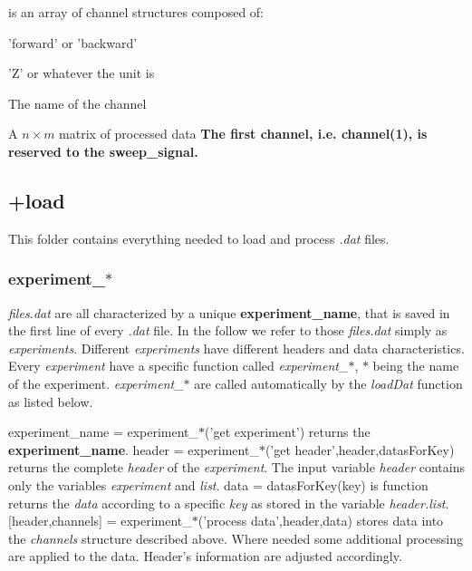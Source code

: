 \item[channels] is an array of channel structures composed of:
  \bdf
  \item[Direction] 'forward' or 'backward'
  \item[Unit] 'Z' or whatever the unit is
  \item[Name] The name of the channel
  \item[data] A $n\times m$ matrix of processed data
  \edf
\edf
\textbf{The first channel, i.e. channel(1), is reserved to the sweep\_signal.}

\subsection{+load}
This folder contains everything needed to load and process \emph{.dat} files.
\subsubsection{experiment\_$\ast$}
\emph{files.dat} are all characterized by a unique \textbf{experiment\_name}, that is saved in the first line of every \emph{.dat} file.
In the follow we refer to those \emph{files.dat} simply as \emph{experiments}.
Different \emph{experiments} have different headers and data characteristics.
Every \emph{experiment} have a specific function called \emph{experiment\_$\ast$}, \emph{$\ast$} being the name of the experiment.
\emph{experiment\_$\ast$} are called automatically by the \emph{loadDat} function as listed below.

\bdf
\+ {experiment\_name = experiment\_$\ast$('get experiment')} returns the \textbf{experiment\_name}.
\+ {header = experiment\_$\ast$('get header',header,datasForKey)} returns the complete \emph{header} of the \emph{experiment}. 
The input variable \emph{header} contains only the variables \emph{experiment} and \emph{list}.
  \bdf
  \+ {data = datasForKey(key)} is function returns the \emph{data} according to a specific \emph{key} as stored in the variable \emph{header.list}.
  \edf  
\+ {[header,channels] = experiment\_$\ast$('process data',header,data)} stores data into the \emph{channels} structure described above. Where needed some additional processing are applied to the data. Header's information are adjusted accordingly.
\edf

